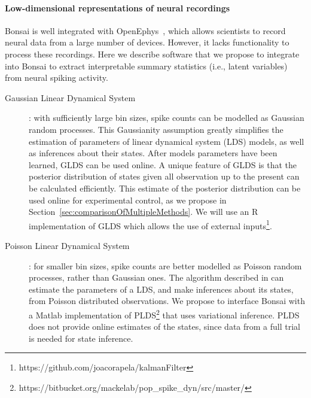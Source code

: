 \paragraph{Low-dimensional representations of neural recordings}
\label{sec:lowDimensionalRepresentation}

Bonsai is well integrated with OpenEphys~\citep{siegleEtAl17}, which allows
scientists to record neural data from a large number of devices. However, it
lacks functionality to process these recordings. Here we describe software that
we propose to integrate into Bonsai to extract interpretable summary statistics
(i.e., latent variables) from neural spiking activity.

\begin{description}

    \item[Gaussian Linear Dynamical
        System]\citep[GLDS][]{andersonAndMoore12}: with sufficiently large
        bin sizes, spike counts can be modelled as Gaussian random processes.
        This Gaussianity assumption greatly simplifies the estimation of
        parameters of linear dynamical system (LDS) models, as well as
        inferences about their states. After models parameters have been
        learned, GLDS can be used online. A unique feature of GLDS is that the
        posterior distribution of states given all observation up to the
        present can be calculated efficiently. This estimate of the posterior
        distribution can be used online for experimental control, as we
        propose in Section~\ref{sec:comparisonOfMultipleMethods}. We will use an R implementation of GLDS
        which allows the use of external
        inputs\footnote{https://github.com/joacorapela/kalmanFilter}.

    \item[Poisson Linear Dynamical System]\citep[PLDS][]{mackeEtAl15}: for
        smaller bin sizes, spike counts are better modelled as Poisson random
        processes, rather than Gaussian ones. The algorithm described in
        \citet{mackeEtAl15} can estimate the parameters of a LDS, and make
        inferences about its states, from Poisson distributed observations.  We
        propose to interface Bonsai with a Matlab implementation of
        PLDS\footnote{https://bitbucket.org/mackelab/pop\_spike\_dyn/src/master/}
        that uses variational inference. PLDS does not provide online estimates
        of the states, since data from a full trial is needed for state
        inference.


\end{description}

